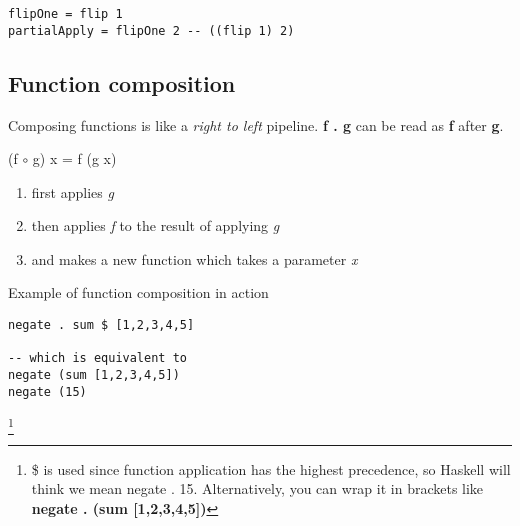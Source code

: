 \begin{lstlisting}
flipOne = flip 1
partialApply = flipOne 2 -- ((flip 1) 2)
\end{lstlisting}

\subsection{Function composition}
Composing functions is like a \emph{right to left} pipeline. \textbf{f . g} can be read
as \textbf{f} after \textbf{g}.

(f $\circ$ g) x = f (g x)
\begin{enumerate}
    \item first applies \emph{g}
    \item then applies \emph{f} to the result of applying \emph{g}
    \item and makes a new function which takes a parameter \emph{x}
\end{enumerate} 

Example of function composition in action
\begin{lstlisting}
negate . sum $ [1,2,3,4,5]

-- which is equivalent to
negate (sum [1,2,3,4,5])
negate (15)
\end{lstlisting}

\footnote{
    \$ is used since function application has the highest precedence, so Haskell will think we mean negate . 15.
    Alternatively, you can wrap it in brackets like \textbf{negate . (sum [1,2,3,4,5])}}